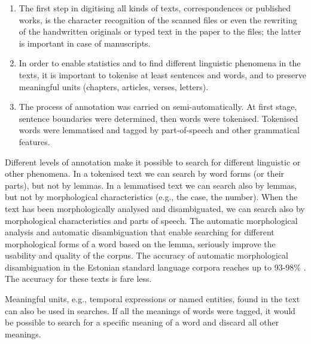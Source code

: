\documentclass[runningheads]{llncs}
\begin{document}
\begin{enumerate}
\item The first step in digitising all kinds of texts, correspondences or published works, is the character recognition of the scanned files or even the rewriting of the handwritten originals or typed text in the paper to the files; the latter is important in case of manuscripts. 

\item In order to enable statistics and to find different linguistic phenomena in the texts, it is important to tokenise at least sentences and words, and to preserve meaningful units (chapters, articles, verses, letters). 

  \item The process of annotation was carried on semi-automatically. At first stage, sentence boundaries were determined, then words were tokenised. Tokenised words were lemmatised and tagged by part-of-speech and other grammatical features.

\end{enumerate}

Different levels of annotation make it possible to search for different linguistic or other phenomena. In a tokenised text we can search by word forms (or their parts), but not by lemmas. In a lemmatised text we can search also by lemmas, but not by morphological characteristics (e.g., the case, the number). When the text has been morphologically analysed and disambiguated, we can search also by morphological characteristics and parts of speech. The automatic morphological analysis and automatic disambiguation that enable searching for different morphological forms of a word based on the lemma, seriously improve the usability and quality of the corpus. The accuracy of automatic morphological disambiguation in the Estonian standard language corpora reaches up to 93-98\% \cite{veskisliba}.  The accuracy for these texts is fare less.


Meaningful units, e.g., temporal expressions or named entities, found in the text can also be used in searches. If all the meanings of words were tagged, it would be possible to search for a specific meaning of a word and discard all other meanings. 
\end{document}
